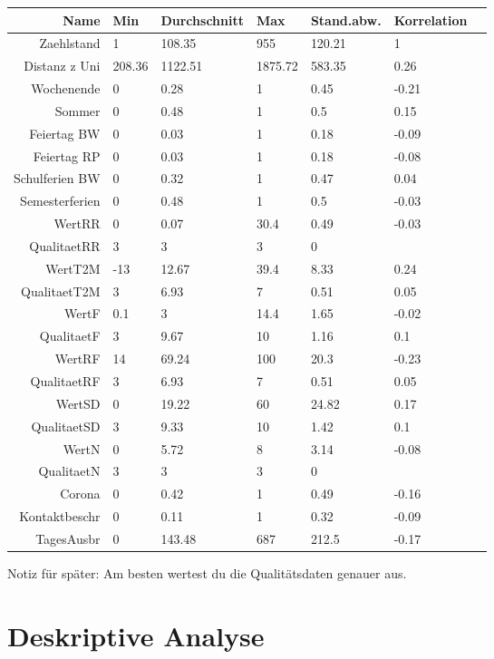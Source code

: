 \documentclass[a4paper,12pt]{thesis}
\begin{document}
\begin{table}[!ht]
	\centering
	\begin{tabular}{rllllll}
		\hline
		Name & Min & Durchschnitt & Max & Stand.abw. & Korrelation \\ 
		\hline
		Zaehlstand & 1 & 108.35 & 955 & 120.21 & 1 \\ 
		Distanz z Uni & 208.36 & 1122.51 & 1875.72 & 583.35 & 0.26 \\ 
		Wochenende & 0 & 0.28 & 1 & 0.45 & -0.21 \\ 
		Sommer & 0 & 0.48 & 1 & 0.5 & 0.15 \\ 
		Feiertag BW & 0 & 0.03 & 1 & 0.18 & -0.09 \\ 
		Feiertag RP & 0 & 0.03 & 1 & 0.18 & -0.08 \\ 
		Schulferien BW & 0 & 0.32 & 1 & 0.47 & 0.04 \\ 
		Semesterferien & 0 & 0.48 & 1 & 0.5 & -0.03 \\ 
		WertRR & 0 & 0.07 & 30.4 & 0.49 & -0.03 \\ 
		QualitaetRR & 3 & 3 & 3 & 0 &  \\ 
		WertT2M & -13 & 12.67 & 39.4 & 8.33 & 0.24 \\ 
		QualitaetT2M & 3 & 6.93 & 7 & 0.51 & 0.05 \\ 
		WertF & 0.1 & 3 & 14.4 & 1.65 & -0.02 \\ 
		QualitaetF & 3 & 9.67 & 10 & 1.16 & 0.1 \\ 
		WertRF & 14 & 69.24 & 100 & 20.3 & -0.23 \\ 
		QualitaetRF & 3 & 6.93 & 7 & 0.51 & 0.05 \\ 
		WertSD & 0 & 19.22 & 60 & 24.82 & 0.17 \\ 
		QualitaetSD & 3 & 9.33 & 10 & 1.42 & 0.1 \\ 
		WertN & 0 & 5.72 & 8 & 3.14 & -0.08 \\ 
		QualitaetN & 3 & 3 & 3 & 0 &  \\ 
		Corona & 0 & 0.42 & 1 & 0.49 & -0.16 \\ 
		Kontaktbeschr & 0 & 0.11 & 1 & 0.32 & -0.09 \\ 
		TagesAusbr & 0 & 143.48 & 687 & 212.5 & -0.17 \\ 
		\hline
	\end{tabular}
	\label{Tabelle1}
\end{table}

Notiz für später: Am besten wertest du die Qualitätsdaten genauer aus.

\chapter{Deskriptive Analyse}
\end{document}
